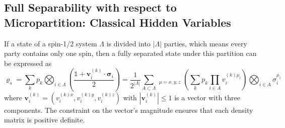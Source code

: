 \documentclass[12font]{article}
\numberwithin{equation}{section}    %
\theoremstyle{definition}
\newcommand{\lr}[1]{\left(  #1  \right)}
\newcommand{\lrg}[1]{\left\{  #1  \right\}}
\newcommand{\abs}[1]{\left|  #1  \right|}
\newcommand{\bo}[1]{\mathbf{#1}}
\newcommand{\bog}[1]{\boldsymbol{#1}}
\begin{document}
\subsection{Full Separability with respect to Micropartition: Classical Hidden Variables}
If a state of a spin-1/2 system $\Lambda$ is divided into $\abs{\Lambda}$ parties, which means every party contains only one spin, then a fully separated state under this partition can be expressed as
\begin{equation}\label{eq:fsp-decomp}
    \varrho_{s} = \sum_{k} p_k \bigotimes_{i\in\Lambda}\lr{\frac{\mathds{1} + \bo{v}_i^{(k)}\cdot\bog{\sigma}_i}{2}}
    =
    \frac{1}{2^{\abs{\Lambda}}}
    \sum_{A\subset\Lambda} 
    \mathop{\sum_{\lrg{\mu}_A}}_{\mu=x,y,z}
    \lr{ 
        \sum_{k} p_k 
        \prod_{i\in A}v^{(k)\mu_i}_i
    }
    \bigotimes_{i\in A}\sigma_i^{\mu_i}
\end{equation}
where $\bo{v}_i^{(k)} = (v_i^{(k)x}, v_i^{(k)y}, v_i^{(k)z})$ with $\abs{\bo{v}_i^{(k)}}\leq 1$ is a vector with three components. The constraint on the vector's magnitude ensures that each density matrix is positive definite.
\end{document}
